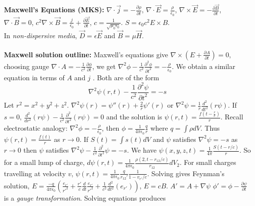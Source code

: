 \\
\\
{\bf Maxwell's Equations (MKS):}
$\nabla \cdot {\vec j} = - {\frac {\partial \rho} {\partial t}}$,
$\nabla \cdot {\vec E} = {\frac {\rho} {\epsilon_{0}}}$,
$\nabla \times {\vec E} = - {\frac {\partial {\vec B}}{\partial t}}$,
$\nabla \cdot {\vec B} = 0$,
${c^{2}} \nabla \times {\vec B} = {\frac {j} {\epsilon_{0}}} +
{\frac {\partial {\vec E}} {\partial t}}$, $c= {\frac 1 {\sqrt { \mu_0 \epsilon_0}}}$.
$S= \epsilon_0 c^2 E \times B$.
\\
In \emph{non-dispersive media}, ${\vec D} = \epsilon {\vec E} $ and ${\vec B} = \mu {\vec H}$.
\\
\\
{\bf Maxwell solution outline:} 
Maxwell's equations give $\nabla \times (E+{\frac {\partial A} {\partial t}})= 0$, choosing
gauge 
$\nabla \cdot A= -{\frac 1 {c^2}} {\frac {\partial \phi} {\partial t}}$, we get
$\nabla^2 \phi - {\frac 1 {c^2}} {\frac {\partial^2 \phi} {{\partial t}^2}} = - {\frac
{\rho} {\epsilon_0}}$.  We obtain a similar equation in terms of $A$ and $j$ .  Both are of
the form
$$\nabla^2 \psi(r,t)- {\frac 1 {c^2}} {\frac {\partial^2 \psi} {{\partial t}^2}}= -s$$
Let $r^2=x^2+y^2+z^2$. $\nabla^2 \psi(r) = \psi''(r) + {\frac 2 r} \psi'(r)$ or
$\nabla^2 \psi = {\frac 1 r} {\frac {d^2} {dt^2}} (r \psi)$.  If $s=0$,
${\frac {d^2} {dr^2}} (r \psi) - {\frac 1 {c^2}} {\frac {\partial^2}{{\partial t}^2}} (r \psi) = 0$
and the solution is $\psi(r,t)= {\frac {f(t-{\frac r c})} r}$.  Recall electrostatic
analogy: $\nabla^2 \phi= -{\frac {\rho} {\epsilon_0}}$, then $\phi= {\frac 1 {4 \pi \epsilon_0}}
{\frac q r}$ where $q= \int \rho dV$.  
Thus $\psi(r,t)= {\frac {f(t)} r}$ as $r \rightarrow 0$.
If $S(t) = \int s(t) dV$ and $\psi$ satisfies $\nabla^2 \psi= -s$ as $r \rightarrow 0$ then
$\psi$ satisfies $\nabla^2 \psi - {\frac 1 {c^2}} {\frac {\partial^2} {{\partial t}^2}} \psi= -s$.
We have $\psi(x,y,z,t)= {\frac 1 {4 \pi}} {\frac {S(t-r/c)} r}$.  So for a small
lump of charge, $d \psi(r,t) = {\frac 1 {4 \pi \epsilon_0}} {\frac {\rho(2,t-r_{12}/c)}
{r_{12}}} dV_2$.  For small charges travelling at velocity $v$,
$\psi(r,t)= {\frac 1 {4 \pi \epsilon_0}} {\frac q {r_{12}'}} {\frac 1 {1- v_{r'}/c}}$.
Solving gives Feynman's solution,
$E= {\frac {-q} {4 \pi \epsilon_{0}}} ({\frac {e_{r'}} {r'^2}}+
{\frac {r'} {c}} {\frac {d} {dt}}{\frac {e_{r'}} {r'^2}} +
{\frac {1} {c^{2}}} {\frac {d^{2}} {{dt}{^2}}}(e_{r'}))$,
$E=cB$.
$A'= A + \nabla \psi$ $\phi'= \phi - {\frac {\partial \psi} {\partial t}}$
is a \emph{gauge transformation}.  Solving equations produces
